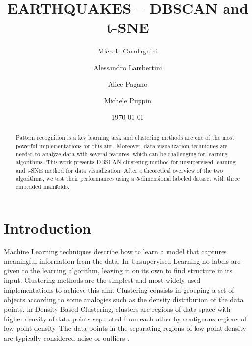 \documentclass[prl,twocolumn]{revtex4-1}
\begin{document}
\title{EARTHQUAKES -- DBSCAN and t-SNE}

\author{Michele Guadagnini}
\author{Alessandro Lambertini}
\author{Alice Pagano}
\author{Michele Puppin}

\date{\today}

\begin{abstract}
Pattern recognition is a key learning task and clustering methods are one of the most powerful implementations for this aim.
Moreover, data visualization techniques are needed to analyze data with several features, which can be challenging for learning algorithms.
This work presents DBSCAN clustering method for unsupervised learning and t-SNE method for data visualization. After a theoretical overview of the two algorithms, we test their performances using a 5-dimensional labeled dataset with three embedded manifolds.

\end{abstract}

\maketitle
\section{Introduction}
Machine Learning techniques describe how to learn a model that captures meaningful information from the data. In Unsupervised Learning no labels are given to the learning algorithm, leaving it on its own to find structure in its input.
Clustering methods are the simplest and most widely used implementations to achieve this aim. Clustering consists in grouping a set of objects according to some analogies such as the density distribution of the data points.
In Density-Based Clustering, clusters are regions of data space with higher density of data points separated from each other by contiguous regions of low point density.  The data points in the separating regions of low point density are typically considered noise or outliers \cite{Mehta_2019}\cite{doi:10.1002/widm.30}.
\end{document}
